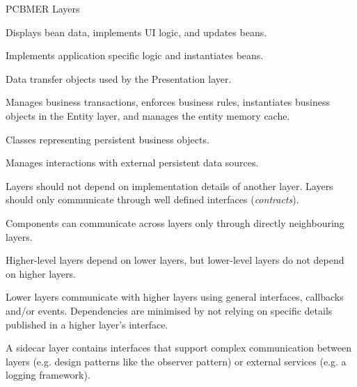\documentclass{slide}
\begin{document}
\begin{frame}{PCBMER Layers}

\large{
\begin{description}[<+->]
    \item[Presentation] Displays bean data, implements UI logic, and updates beans.
    \item[Controller] Implements application specific logic and instantiates beans.
    \item[Bean] Data transfer objects used by the Presentation layer.
    \item[Mediator] Manages business transactions, enforces business rules, instantiates business objects in the Entity layer, and manages the entity memory cache.
    \item[Entity] Classes representing persistent business objects.
    \item[Resource] Manages interactions with external persistent data sources.
\end{description}
}

\end{frame}


{Layers should not depend on implementation details of another layer.
Layers should only communicate through well defined interfaces (\emph{contracts}).}

{Components can communicate across layers only through directly neighbouring layers.}

{Higher-level layers depend on lower layers, but lower-level layers do not depend on higher layers.}

{Lower layers communicate with higher layers using general interfaces, callbacks and/or events.
Dependencies are minimised by not relying on specific details published in a higher layer’s interface.}

{A sidecar layer contains interfaces that support complex communication between layers
(e.g. design patterns like the observer pattern) or external services (e.g. a logging framework).}



\end{document}

